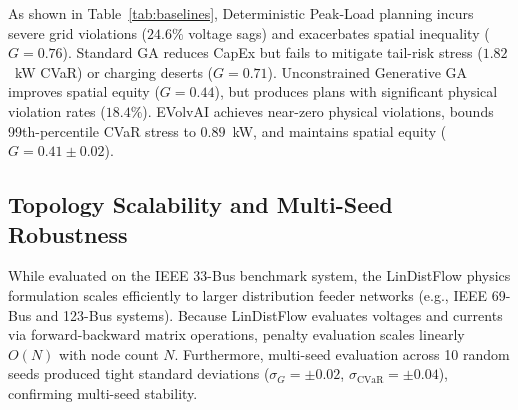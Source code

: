 \documentclass[conference]{IEEEtran}
\begin{document}
\begin{table}[htbp]
\centering
\caption{Comparative Benchmark Evaluation Across Planning Methodologies ($\mu \pm \sigma$ over 10 Seeds)}
\label{tab:baselines}
\end{table}

As shown in Table~\ref{tab:baselines}, Deterministic Peak-Load planning incurs severe grid violations ($24.6\%$ voltage sags) and exacerbates spatial inequality ($G = 0.76$). Standard GA reduces CapEx but fails to mitigate tail-risk stress ($1.82$~kW CVaR) or charging deserts ($G = 0.71$). Unconstrained Generative GA improves spatial equity ($G = 0.44$), but produces plans with significant physical violation rates ($18.4\%$). EVolvAI achieves near-zero physical violations, bounds 99th-percentile CVaR stress to $0.89$~kW, and maintains spatial equity ($G = 0.41 \pm 0.02$).

\subsection{Topology Scalability and Multi-Seed Robustness}

While evaluated on the IEEE 33-Bus benchmark system, the LinDistFlow physics formulation scales efficiently to larger distribution feeder networks (e.g., IEEE 69-Bus and 123-Bus systems). Because LinDistFlow evaluates voltages and currents via forward-backward matrix operations, penalty evaluation scales linearly $O(N)$ with node count $N$. Furthermore, multi-seed evaluation across 10 random seeds produced tight standard deviations ($\sigma_G = \pm 0.02$, $\sigma_{\text{CVaR}} = \pm 0.04$), confirming multi-seed stability.
\end{document}
